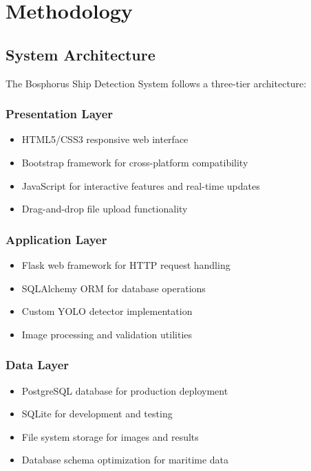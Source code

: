 \documentclass[12pt,a4paper]{report}
\begin{document}
\chapter{Methodology}

\section{System Architecture}
The Bosphorus Ship Detection System follows a three-tier architecture:

\subsection{Presentation Layer}
\begin{itemize}
    \item HTML5/CSS3 responsive web interface
    \item Bootstrap framework for cross-platform compatibility
    \item JavaScript for interactive features and real-time updates
    \item Drag-and-drop file upload functionality
\end{itemize}

\subsection{Application Layer}
\begin{itemize}
    \item Flask web framework for HTTP request handling
    \item SQLAlchemy ORM for database operations
    \item Custom YOLO detector implementation
    \item Image processing and validation utilities
\end{itemize}

\subsection{Data Layer}
\begin{itemize}
    \item PostgreSQL database for production deployment
    \item SQLite for development and testing
    \item File system storage for images and results
    \item Database schema optimization for maritime data
\end{itemize}
\end{document}
